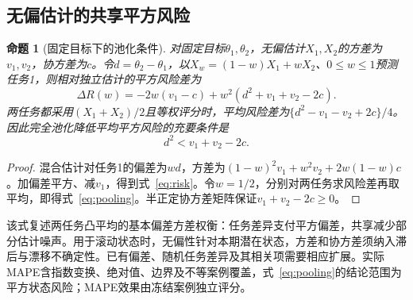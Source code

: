 \documentclass[preprint,12pt]{elsarticle}
\newtheorem{proposition}{命题}
\begin{document}
\subsection{无偏估计的共享平方风险}
\begin{proposition}[固定目标下的池化条件]\label{prop:risk}
对固定目标\(\theta_1,\theta_2\)，无偏估计\(X_1,X_2\)的方差为\(v_1,v_2\)，协方差为\(c\)。令\(d=\theta_2-\theta_1\)，以\(X_w=(1-w)X_1+wX_2\)、\(0\le w\le1\)预测任务1，则相对独立估计的平方风险差为
\begin{equation}\label{eq:risk}
\Delta R(w)=-2w(v_1-c)+w^2(d^2+v_1+v_2-2c).
\end{equation}
两任务都采用\((X_1+X_2)/2\)且等权评分时，平均风险差为\(\{d^2-v_1-v_2+2c\}/4\)。因此完全池化降低平均平方风险的充要条件是
\begin{equation}\label{eq:pooling}
d^2<v_1+v_2-2c.
\end{equation}
\end{proposition}
\begin{proof}
混合估计对任务1的偏差为\(wd\)，方差为\((1-w)^2v_1+w^2v_2+2w(1-w)c\)。加偏差平方、减\(v_1\)，得到式~\eqref{eq:risk}。令\(w=1/2\)，分别对两任务求风险差再取平均，即得式~\eqref{eq:pooling}。半正定协方差矩阵保证\(v_1+v_2-2c\ge0\)。
\end{proof}
该式复述两任务凸平均的基本偏差方差权衡\citep{bates1969combination,feldman2014averaging}：任务差异支付平方偏差，共享减少部分估计噪声。用于滚动状态时，无偏性针对本期潜在状态，方差和协方差须纳入滞后与漂移不确定性。已有偏差、随机任务差异及其相关项需要相应扩展。实际MAPE含指数变换、绝对值、边界及不等案例覆盖，式~\eqref{eq:pooling}的结论范围为平方状态风险；MAPE效果由冻结案例独立评分。
\end{document}
